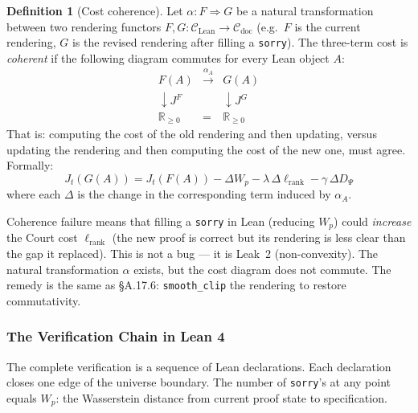 \documentclass[11pt,a4paper]{article}
\theoremstyle{definition}
\newtheorem{definition}[theorem]{Definition}
\theoremstyle{remark}
\begin{document}
\begin{definition}[Cost coherence]\label{def:coherence}
Let $\alpha: F \Rightarrow G$ be a natural transformation between two rendering functors $F, G: \mathcal{C}_{\mathrm{Lean}} \to \mathcal{C}_{\mathrm{doc}}$ (e.g.\ $F$ is the current rendering, $G$ is the revised rendering after filling a \texttt{sorry}). The three-term cost is \emph{coherent} if the following diagram commutes for every Lean object $A$:
\[
\begin{array}{ccc}
F(A) & \xrightarrow{\alpha_A} & G(A) \\
\downarrow\scriptstyle{J^F} & & \downarrow\scriptstyle{J^G} \\
\mathbb{R}_{\geq 0} & = & \mathbb{R}_{\geq 0}
\end{array}
\]
That is: computing the cost of the old rendering and then updating, versus updating the rendering and then computing the cost of the new one, must agree. Formally:
\[
J_t(G(A)) = J_t(F(A)) - \Delta W_p - \lambda\,\Delta\ell_{\mathrm{rank}} - \gamma\,\Delta D_\Psi
\]
where each $\Delta$ is the change in the corresponding term induced by $\alpha_A$.
\end{definition}

Coherence failure means that filling a \texttt{sorry} in Lean (reducing $W_p$) could \emph{increase} the Court cost $\ell_{\mathrm{rank}}$ (the new proof is correct but its rendering is less clear than the gap it replaced). This is not a bug --- it is Leak~2 (non-convexity). The natural transformation $\alpha$ exists, but the cost diagram does not commute. The remedy is the same as \S A.17.6: \texttt{smooth\_clip} the rendering to restore commutativity.

\subsubsection*{The Verification Chain in Lean 4}

The complete verification is a sequence of Lean declarations. Each declaration closes one edge of the universe boundary. The number of \texttt{sorry}'s at any point equals $W_p$: the Wasserstein distance from current proof state to specification.
\end{document}

